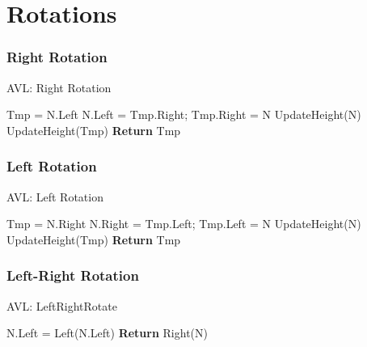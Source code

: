 \documentclass{beamer}
\begin{document}
\section{Rotations}
\begin{frame}
    \frametitle{Right Rotation}
    \begin{minipage}{0.49\textwidth}
    \begin{algorithm}[H]
        \caption{AVL: Right Rotation}\label{}
        \begin{algorithmic}[1]
            \State Tmp = N.Left
            \State N.Left = Tmp.Right;
            \State Tmp.Right = N
            \State 
            \State UpdateHeight(N)
            \State UpdateHeight(Tmp)
            \State
            \State \textbf{Return} Tmp
            \EndProcedure
        \end{algorithmic}
    \end{algorithm}
    \end{minipage}
    \begin{minipage}{0.49\textwidth}
        \hfill
    \end{minipage}
\end{frame}

\begin{frame}
    \frametitle{Left Rotation}
    \begin{minipage}{0.49\textwidth}
    \begin{algorithm}[H]
        \caption{AVL: Left Rotation}\label{}
        \begin{algorithmic}[1]
            \State Tmp = N.Right
            \State N.Right = Tmp.Left;
            \State Tmp.Left = N
            \State 
            \State UpdateHeight(N)
            \State UpdateHeight(Tmp)
            \State
            \State \textbf{Return} Tmp
            \EndProcedure
        \end{algorithmic}
    \end{algorithm}
    \end{minipage}
    \begin{minipage}{0.49\textwidth}
        \hfill
    \end{minipage}
\end{frame}

\begin{frame}
    \frametitle{Left-Right Rotation}
    \vspace{4cm}
    \begin{algorithm}[H]
        \caption{AVL: LeftRightRotate}\label{}
        \begin{algorithmic}[1]
            \State N.Left = Left(N.Left)
            \State \textbf{Return} Right(N)
            \EndProcedure
        \end{algorithmic}
    \end{algorithm}
\end{frame}
\end{document}
